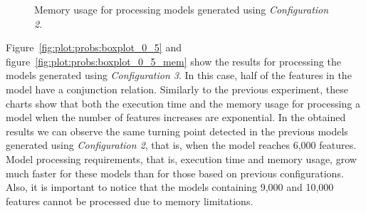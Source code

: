 \begin{figure}[h]
\begin{minipage}[b]{0.48\textwidth}
                \caption{Memory usage for processing models generated using \textit{Configuration 2}.}\label{fig:plot:probs:boxplot_0_2_mem}
        \end{minipage}
\end{figure}

Figure~\ref{fig:plot:probs:boxplot_0_5} and figure~\ref{fig:plot:probs:boxplot_0_5_mem} show the results for processing the models generated using \textit{Configuration 3}. In this case, half of the features in the model have a conjunction relation. Similarly to the previous experiment, these charts show that both the execution time and the memory usage for processing a model when the number of features increases are exponential. In the obtained results we can observe the same turning point detected in the previous models generated using  \textit{Configuration 2}, that is, when the model reaches 6,000 features. Model processing requirements, that is, execution time and memory usage, grow much faster for these models than for those based on previous configurations. Also, it is important to notice that the models containing 9,000 and 10,000 features cannot be processed due to memory limitations.

